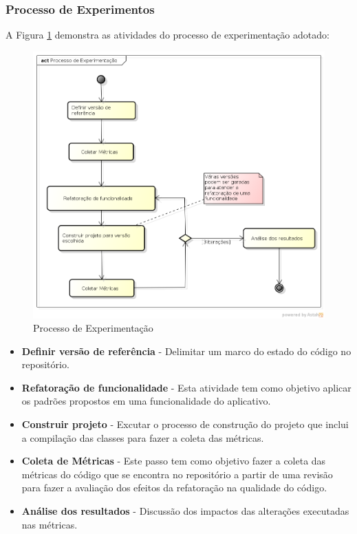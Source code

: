 \documentclass[conference]{IEEEtran}
\begin{document}
\subsubsection{Processo de Experimentos}


A Figura \ref{processo_experimentacao} demonstra as atividades do processo de
experimentação adotado:
\begin{figure}[!htb]
	\begin{center}
	\includegraphics[scale=0.33]{img/processo_experimentacao.png}
	\end{center}
	
	\caption{\label{processo_experimentacao} Processo de Experimentação}
\end{figure}


\begin{itemize}
\item \textbf{Definir versão de referência} - Delimitar um marco do estado do
código no repositório.
\item \textbf{Refatoração de funcionalidade} - Esta atividade tem como
objetivo aplicar os padrões propostos em uma funcionalidade do aplicativo.
\item \textbf{Construir projeto} - Excutar o processo de construção do
projeto que inclui a compilação das classes para fazer a coleta das métricas.
\item \textbf{Coleta de Métricas} - Este passo tem como objetivo fazer a coleta
das métricas do código que se encontra no repositório a partir de uma revisão
para fazer a avaliação dos efeitos da refatoração na qualidade do código.
\item \textbf{Análise dos resultados} - Discussão dos impactos das alterações
executadas nas métricas.
\end{itemize}
\end{document}
